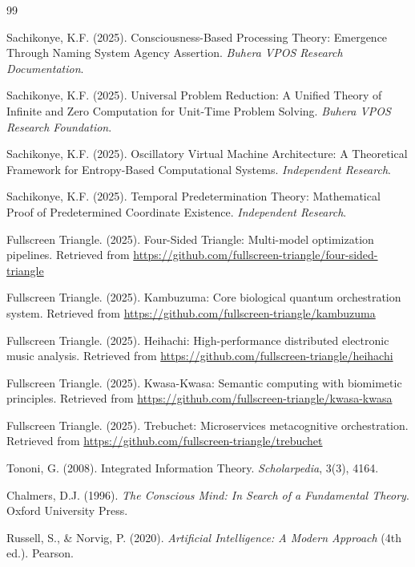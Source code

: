 \documentclass[12pt,a4paper]{article}
\begin{document}

\begin{thebibliography}{99}

Sachikonye, K.F. (2025). Consciousness-Based Processing Theory: Emergence Through Naming System Agency Assertion. \textit{Buhera VPOS Research Documentation}.

Sachikonye, K.F. (2025). Universal Problem Reduction: A Unified Theory of Infinite and Zero Computation for Unit-Time Problem Solving. \textit{Buhera VPOS Research Foundation}.

Sachikonye, K.F. (2025). Oscillatory Virtual Machine Architecture: A Theoretical Framework for Entropy-Based Computational Systems. \textit{Independent Research}.

Sachikonye, K.F. (2025). Temporal Predetermination Theory: Mathematical Proof of Predetermined Coordinate Existence. \textit{Independent Research}.

Fullscreen Triangle. (2025). Four-Sided Triangle: Multi-model optimization pipelines. Retrieved from \url{https://github.com/fullscreen-triangle/four-sided-triangle}

Fullscreen Triangle. (2025). Kambuzuma: Core biological quantum orchestration system. Retrieved from \url{https://github.com/fullscreen-triangle/kambuzuma}

Fullscreen Triangle. (2025). Heihachi: High-performance distributed electronic music analysis. Retrieved from \url{https://github.com/fullscreen-triangle/heihachi}

Fullscreen Triangle. (2025). Kwasa-Kwasa: Semantic computing with biomimetic principles. Retrieved from \url{https://github.com/fullscreen-triangle/kwasa-kwasa}

Fullscreen Triangle. (2025). Trebuchet: Microservices metacognitive orchestration. Retrieved from \url{https://github.com/fullscreen-triangle/trebuchet}

Tononi, G. (2008). Integrated Information Theory. \textit{Scholarpedia}, 3(3), 4164.

Chalmers, D.J. (1996). \textit{The Conscious Mind: In Search of a Fundamental Theory}. Oxford University Press.

Russell, S., \& Norvig, P. (2020). \textit{Artificial Intelligence: A Modern Approach} (4th ed.). Pearson.


\end{thebibliography}
\end{document}
